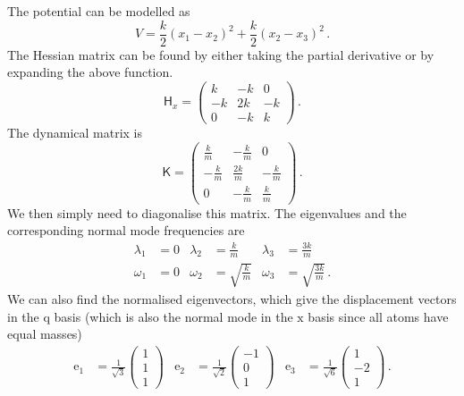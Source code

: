 \documentclass{article}
\theoremstyle{plain}\theoremheaderfont{\normalfont\itshape}\theorembodyfont{\rmfamily}\theoremseparator{.}\newtheorem*{rem}{Remark}\newtheorem*{ex}{Example}\newtheorem*{proof}{Proof}\newtheorem*{altp}{Alternative proof}
\theoremstyle{plain}\theoremheaderfont{\normalfont\bfseries}\theorembodyfont{\rmfamily}\theoremseparator{.}\newtheorem{thm}{Theorem}[section]\newtheorem{lem}[thm]{Lemma}\newtheorem{prop}[thm]{Proposition}\newtheorem*{cor}{Corollary}\newtheorem{defn}[thm]{Definition}\newtheorem{clm}[thm]{Claim}\newtheorem{clminproof}{Claim}
\theoremstyle{break}\theoremheaderfont{\normalfont\itshape}\theorembodyfont{\rmfamily}\theoremseparator{.\medskip}\newtheorem*{proofskip}{Proof}\newtheorem*{exs}{Examples}\newtheorem*{rems}{Remarks}
\theoremstyle{break}\theoremheaderfont{\normalfont\bfseries}\theorembodyfont{\rmfamily}\theoremseparator{.\medskip}\newtheorem{lemskip}[thm]{Lemma}\newtheorem{defnskip}[thm]{Definition}\newtheorem{propskip}[thm]{Proposition}\newtheorem{thmskip}[thm]{Theorem}
\numberwithin{equation}{section}
\newcommand{\vb}[1]{\bm{\mathrm{#1}}}
\begin{document}
    The potential can be modelled as
    \begin{equation}
        V=\frac{k}{2}(x_1-x_2)^2+\frac{k}{2}(x_2-x_3)^2\,.
    \end{equation}
    The Hessian matrix can be found by either taking the partial derivative or by expanding the above function.
    \begin{equation}
        \mathsf{H}_x=\begin{pmatrix}
            k & -k & 0 \\
            -k & 2k & -k \\
            0 & -k & k
        \end{pmatrix}\,.
    \end{equation}
    The dynamical matrix is
    \begin{equation}
        \mathsf{K}=\begin{pmatrix}
            \frac{k}{m} & -\frac{k}{m} & 0 \\
            -\frac{k}{m} & \frac{2k}{m} & -\frac{k}{m} \\
            0 & -\frac{k}{m} & \frac{k}{m}
        \end{pmatrix}\,.
    \end{equation}
    We then simply need to diagonalise this matrix. The eigenvalues and the corresponding normal mode frequencies are
    \begin{align}
        \lambda_1&=0 & \lambda_2&=\frac{k}{m} & \lambda_3&=\frac{3k}{m} \\
        \omega_1&=0 & \omega_2&=\sqrt{\frac{k}{m}} & \omega_3&=\sqrt{\frac{3k}{m}}\,.
    \end{align}
    We can also find the normalised eigenvectors, which give the displacement vectors in the \(\vb{q}\) basis (which is also the normal mode in the \(\vb{x}\) basis since all atoms have equal masses)
    \begin{align}
        \vb{e}_1&=\frac{1}{\sqrt{3}}\begin{pmatrix}
            1 \\ 1 \\ 1
        \end{pmatrix} & \vb{e}_2&=\frac{1}{\sqrt{2}}\begin{pmatrix}
            -1 \\ 0 \\ 1
        \end{pmatrix} & \vb{e}_3&=\frac{1}{\sqrt{6}}\begin{pmatrix}
            1 \\ -2 \\ 1
        \end{pmatrix}\,.
    \end{align}
\end{document}
